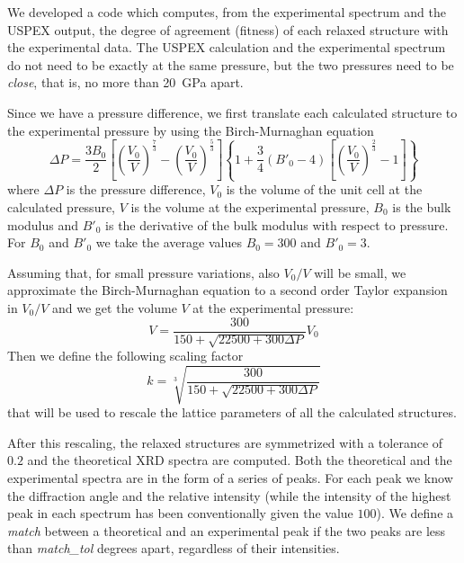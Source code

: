 \documentclass{article}
\begin{document}
We developed a code which computes, from the experimental spectrum and the USPEX output, the degree of agreement (fitness) of each relaxed structure with the experimental data. The USPEX calculation and the experimental spectrum do not need to be exactly at the same pressure, but the two pressures need to be \emph{close}, that is, no more than \SI{20}{GPa} apart.

Since we have a pressure difference, we first translate each calculated structure to the experimental pressure by using the Birch-Murnaghan equation
\begin{equation*}
	\Delta P = \frac{3 B_0}{2} \left[ \left( \frac{V_0}{V} \right)^{\frac{7}{3}} - \left( \frac{V_0}{V} \right)^{\frac{5}{3}} \right] \left\{ 1 + \frac{3}{4} \left( B'_0 - 4 \right) \left[ \left( \frac{V_0}{V} \right)^{\frac{2}{3}} - 1 \right] \right\}
\end{equation*}
where $\Delta P$ is the pressure difference, $V_0$ is the volume of the unit cell at the calculated pressure, $V$ is the volume at the experimental pressure, $B_0$ is the bulk modulus and $B'_0$ is the derivative of the bulk modulus with respect to pressure. For $B_0$ and $B'_0$ we take the average values $B_0 = 300$ and $B'_0 = 3$. 

Assuming that, for small pressure variations, also $V_0/V$ will be small, we approximate the Birch-Murnaghan equation to a second order Taylor expansion in $V_0/V$ and we get the volume $V$ at the experimental pressure:
\begin{equation*}
	V = \frac{300}{150 + \sqrt{22500 + 300 \Delta P}} V_0
\end{equation*}
Then we define the following scaling factor
\begin{equation*}
	k = \sqrt[3]{\frac{300}{150 + \sqrt{22500 + 300 \Delta P}}}
\end{equation*}
that will be used to rescale the lattice parameters of all the calculated structures.

After this rescaling, the relaxed structures are symmetrized with a tolerance of $0.2$ and the theoretical XRD spectra are computed. Both the theoretical and the experimental spectra are in the form of a series of peaks. For each peak we know the diffraction angle and the relative intensity (while the intensity of the highest peak in each spectrum has been conventionally given the value $100$). We define a \emph{match} between a theoretical and an experimental peak if the two peaks are less than \emph{match\_tol} degrees apart, regardless of their intensities.
\end{document}
